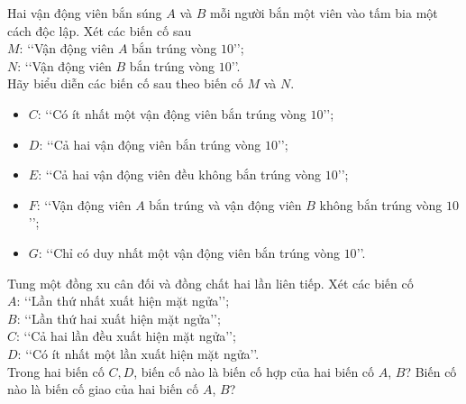 \begin{bt}[Mức 1]%
	Hai vận động viên bắn súng $A$ và $B$ mỗi người bắn một viên vào tấm bia một cách độc lập. Xét các biến  cố sau\\
	$M$: \lq\lq Vận động viên $A$ bắn trúng vòng $10$\rq\rq;\\
	$N$: \lq\lq Vận động viên $B$ bắn trúng vòng $10$\rq\rq.\\
	Hãy biểu diễn các biến cố sau theo biến cố $M$ và $N$.
	\begin{itemize}
		\item $C$: \lq\lq Có ít nhất một vận động viên bắn trúng vòng $10$\rq\rq;
		\item $D$: \lq\lq Cả hai vận động viên bắn trúng vòng $10$\rq\rq;
		\item $E$: \lq\lq Cả hai vận động viên đều không bắn trúng vòng $10$\rq\rq;
		\item $F$: \lq\lq Vận động viên $A$ bắn trúng và vận động viên $B$ không bắn trúng vòng $10$\rq\rq;
		\item  $G$: \lq\lq Chỉ có duy nhất một vận động viên bắn trúng vòng $10$\rq\rq.
	\end{itemize}
\end{bt}

\begin{bt}[CD, mức 1]%
	Tung một đồng xu cân đối và đồng chất hai lần liên tiếp. Xét các biến cố\\
	$A$: \lq\lq Lần thứ nhất xuất hiện mặt ngửa\rq\rq;\\
	$B$: \lq\lq Lần thứ hai xuất hiện mặt ngửa\rq\rq;\\
	$C$: \lq\lq Cả hai lần đều xuất hiện mặt ngửa\rq\rq;\\
	$D$: \lq\lq Có ít nhất một lần xuất hiện mặt ngửa\rq\rq.\\
	Trong hai biến cố $C, D$, biến cố nào là biến cố hợp của hai biến cố $A$, $B$? Biến cố nào là biến cố giao của hai biến cố $A$, $B$?
\end{bt}

